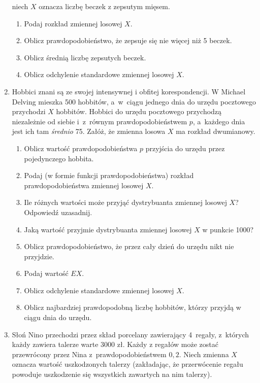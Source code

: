 \documentclass{mwart}
\newcommand{\ans}[1]{}
\newcommand{\ans}[1]{\emph{Odpowiedź:} #1}
\begin{document}
\begin{enumerate}
niech $X$ oznacza liczbę beczek z zepsutym mięsem.  \begin{enumerate}
\item Podaj rozkład zmiennej losowej $X$. \ans{$P(X=k)={1000\choose k}p^k(1-p)^{1000-k}\approx\frac{\lambda^k}{k!}e^{-\lambda} \quad \lambda=1000\cdot0{,}0045=4{,}5$}
\item Oblicz prawdopodobieństwo, że zepsuje się nie więcej niż 5 beczek. \ans{$P(X\leq 5)=0{,}70290$}
\item Oblicz średnią liczbę zepsutych beczek. \ans{$EX=4{,}5$}
\item Oblicz odchylenie standardowe zmiennej losowej $X$. \ans{$DX=\sqrt{4{,}5}$}
\end{enumerate}
\item Hobbici znani są ze swojej intensywnej i obfitej korespondencji. W Michael
Delving mieszka 500 hobbitów, a~w~ciągu jednego dnia do urzędu pocztowego
przychodzi $X$ hobbitów. Hobbici do urzędu pocztowego przychodzą niezależnie od
siebie i~z~równym prawdopodobieństwem $p$, a~każdego dnia jest ich tam
\emph{średnio} 75. Załóż, że zmienna losowa $X$ ma rozkład dwumianowy.
\begin{enumerate}
\item Oblicz wartość prawdopodobieństwa $p$ przyjścia do urzędu przez pojedynczego hobbita.
\item Podaj  (w formie funkcji prawdopodobieństwa) rozkład prawdopodobieństwa zmiennej losowej $X$.
\item Ile różnych wartości może przyjąć dystrybuanta zmiennej losowej $X$? Odpowiedź uzasadnij.
\item Jaką wartość przyjmie dystrybuanta zmiennej losowej $X$ w punkcie 1000?
\item Oblicz prawdopodobieństwo, że przez cały dzień do urzędu nikt nie przyjdzie.
\item Podaj wartość $EX$.
\item Oblicz odchylenie standardowe zmiennej losowej $X$.
\item Oblicz najbardziej prawdopodobną liczbę hobbitów, którzy przyjdą w ciągu dnia do urzędu.
\end{enumerate}
\item Słoń Nino przechodzi przez skład porcelany zawierający 4~regały, z~których każdy zawiera talerze warte 3000 zł.
	Każdy z regałów może zostać przewrócony przez Nina z~prawdopodobieństwem $0{,}2$.
	Niech zmienna $X$ oznacza wartość uszkodzonych talerzy (zakładając, że przerwócenie regału powoduje uszkodzenie się wszystkich zawartych na nim talerzy).

\end{enumerate}
\end{document}
